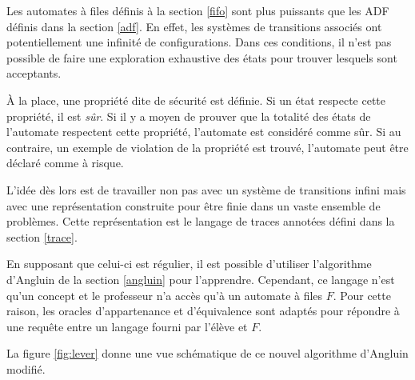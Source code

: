 Les automates à files définis à la section \ref{fifo} sont plus puissants que les ADF définis dans la section \ref{adf}. En effet, les systèmes de transitions associés ont potentiellement une infinité de configurations. Dans ces conditions, il n'est pas possible de faire une exploration exhaustive des états pour trouver lesquels sont acceptants.

À la place, une propriété dite de sécurité est définie. Si un état respecte cette propriété, il est \emph{sûr}. Si il y a moyen de prouver que la totalité des états de l'automate respectent cette propriété, l'automate est considéré comme sûr. Si au contraire, un exemple de violation de la propriété est trouvé, l'automate peut être déclaré comme à risque.

L'idée dès lors est de travailler non pas avec un système de transitions infini mais avec une représentation construite pour être finie dans un vaste ensemble de problèmes. Cette représentation est le langage de traces annotées défini dans la section \ref{trace}.

En supposant que celui-ci est régulier, il est possible d'utiliser l'algorithme d'Angluin de la section \ref{angluin} pour l'apprendre. Cependant, ce langage n'est qu'un concept et le professeur n'a accès qu'à un automate à files $F$. Pour cette raison, les oracles d'appartenance et d'équivalence sont adaptés pour répondre à une requête entre un langage fourni par l'élève et $F$.

La figure \ref{fig:lever} donne une vue schématique de ce nouvel algorithme d'Angluin modifié.


